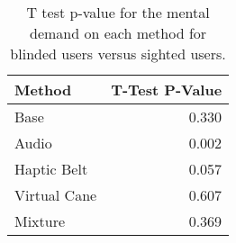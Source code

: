 
\begin{table}[!htb]
\centering
\caption{T test p-value for the mental demand on each method for blinded users versus sighted users.}
\label{tab:ttest_mental_demand}
\begin{tabular}{lr}
\toprule
      Method &  T-Test P-Value \\
\midrule
        Base &           0.330 \\
       Audio &           0.002 \\
 Haptic Belt &           0.057 \\
Virtual Cane &           0.607 \\
     Mixture &           0.369 \\
\bottomrule
\end{tabular}
\end{table}

